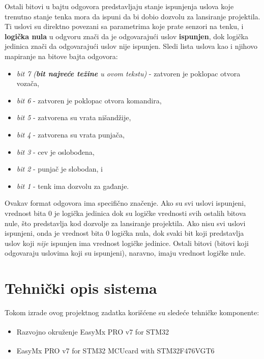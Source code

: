 \documentclass[a4paper, 12pt, oneside, titlepage]{article}
\begin{document}
      Ostali bitovi u bajtu odgovora predstavljaju stanje ispunjenja uslova koje trenutno stanje tenka mora da ispuni
      da bi dobio dozvolu za lansiranje projektila. Ti uslovi su direktno povezani sa parametrima koje prate senzori na
      tenku, i \textbf{logička nula} u odgvoru znači da je odgovarajući uslov \textbf{ispunjen}, dok logička jedinica
      znači da odgovarajući uslov nije ispunjen. Sledi lista uslova kao i njihovo mapiranje na bitove bajta odgovora:
      \begin{itemize}
	\item \emph{bit 7 (\textbf{bit najveće težine} u ovom tekstu)} - zatvoren je poklopac otvora vozača,
	\item \emph{bit 6} - zatvoren je poklopac otvora komandira,
	\item \emph{bit 5} - zatvorena su vrata nišandžije,
	\item \emph{bit 4} - zatvorena su vrata punjača,
	\item \emph{bit 3} - cev je oslobođena,
	\item \emph{bit 2} - punjač je slobodan, i
	\item \emph{bit 1} - tenk ima dozvolu za gađanje.
      \end{itemize}
      
      Ovakav format odgovora ima specifično značenje. Ako su svi uslovi ispunjeni, vrednost bita 0 je logička jedinica
      dok su logičke vrednosti svih ostalih bitova nule, što predstavlja kod dozvolje za lansiranje projektila. Ako nisu
      svi uslovi ispunjeni, onda je vrednost bita 0 logička nula, dok svaki bit koji predstavlja uslov koji \emph{nije}
      ispunjen ima vrednost logičke jedinice. Ostali bitovi (bitovi koji odgovaraju uslovima koji su ispunjeni), naravno,
      imaju vrednost logičke nule.
      
    \section{Tehnički opis sistema} \label{sec:techspec}
    \noindent Tokom izrade ovog projektnog zadatka korišćene su sledeće tehničke komponente:
    \begin{itemize}
      \item Razvojno okruženje EasyMx PRO\texttrademark{} v7 for STM32\textsuperscript{\textregistered}
      \item EasyMx PRO\texttrademark{} v7 for STM32\textsuperscript{\textregistered} MCUcard with STM32F476VGT6
    \end{itemize}
    
\end{document}
